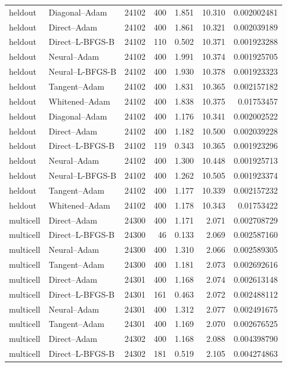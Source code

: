 \begin{longtable}{llrrrrr}
heldout & Diagonal--Adam & 24102 & 400 & 1.851 & 10.310 & 0.002002481\\
heldout & Direct--Adam & 24102 & 400 & 1.861 & 10.321 & 0.002039189\\
heldout & Direct--L-BFGS-B & 24102 & 110 & 0.502 & 10.371 & 0.001923288\\
heldout & Neural--Adam & 24102 & 400 & 1.991 & 10.374 & 0.001925705\\
heldout & Neural--L-BFGS-B & 24102 & 400 & 1.930 & 10.378 & 0.001923323\\
heldout & Tangent--Adam & 24102 & 400 & 1.831 & 10.365 & 0.002157182\\
heldout & Whitened--Adam & 24102 & 400 & 1.838 & 10.375 & 0.01753457\\
heldout & Diagonal--Adam & 24102 & 400 & 1.176 & 10.341 & 0.002002522\\
heldout & Direct--Adam & 24102 & 400 & 1.182 & 10.500 & 0.002039228\\
heldout & Direct--L-BFGS-B & 24102 & 119 & 0.343 & 10.365 & 0.001923296\\
heldout & Neural--Adam & 24102 & 400 & 1.300 & 10.448 & 0.001925713\\
heldout & Neural--L-BFGS-B & 24102 & 400 & 1.262 & 10.505 & 0.001923374\\
heldout & Tangent--Adam & 24102 & 400 & 1.177 & 10.339 & 0.002157232\\
heldout & Whitened--Adam & 24102 & 400 & 1.178 & 10.343 & 0.01753422\\
multicell & Direct--Adam & 24300 & 400 & 1.171 & 2.071 & 0.002708729\\
multicell & Direct--L-BFGS-B & 24300 & 46 & 0.133 & 2.069 & 0.002587160\\
multicell & Neural--Adam & 24300 & 400 & 1.310 & 2.066 & 0.002589305\\
multicell & Tangent--Adam & 24300 & 400 & 1.181 & 2.073 & 0.002692616\\
multicell & Direct--Adam & 24301 & 400 & 1.168 & 2.074 & 0.002613148\\
multicell & Direct--L-BFGS-B & 24301 & 161 & 0.463 & 2.072 & 0.002488112\\
multicell & Neural--Adam & 24301 & 400 & 1.312 & 2.077 & 0.002491675\\
multicell & Tangent--Adam & 24301 & 400 & 1.169 & 2.070 & 0.002676525\\
multicell & Direct--Adam & 24302 & 400 & 1.168 & 2.088 & 0.004398790\\
multicell & Direct--L-BFGS-B & 24302 & 181 & 0.519 & 2.105 & 0.004274863\\

\end{longtable}
